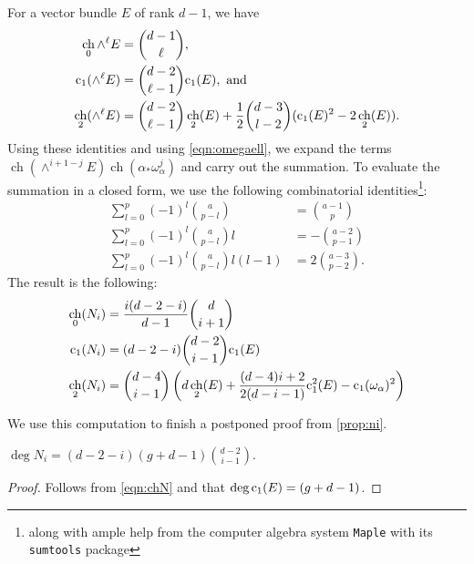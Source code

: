 \documentclass{amsart}
\DeclareMathOperator{\ch}{ch}
\renewcommand{\c}{{\rm c}}
\numberwithin{equation}{section}
\begin{document}
For a vector bundle $E$ of rank $d-1$, we have
\begin{align*}
  \ch_0 \wedge^\ell E &= {{d-1} \choose \ell}, \\
  \c_1(\wedge^\ell E) &= {{d-2} \choose {\ell - 1}} \c_1(E), \text{ and }\\
  \ch_2(\wedge^\ell E) &= {{d-2} \choose {\ell - 1}} \ch_2(E) + \frac{1}{2}{{d-3} \choose {l-2}} (\c_1(E)^2 - 2\ch_2(E)).
\end{align*}
Using these identities and using \eqref{eqn:omegaell}, we expand the terms $\ch(\wedge^{i+1-j}E)\ch(\alpha_*\omega_\alpha^j)$ and carry out the summation.
To evaluate the summation in a closed form, we use the following combinatorial identities\footnote{along with ample help from the computer algebra system \texttt{Maple} with its \texttt{sumtools} package}:
\begin{align*}
  \sum_{l=0}^p (-1)^l {a \choose {p-l}} &= {{a-1} \choose p}\\
  \sum_{l=0}^p (-1)^l {a \choose {p-l}} l &= - {{a-2} \choose {p-1}}\\
  \sum_{l=0}^p (-1)^l {a \choose {p-l}} l(l-1) &=  2 {{a-3} \choose {p-2}}.
\end{align*}
The result is the following:
\begin{equation}\label{eqn:chN}
  \begin{split}
    \ch_0 (N_i) &= \frac{i(d-2-i)}{d-1} {d \choose {i+1}} \\
    \c_1 (N_i) &= (d-2-i) {{d-2} \choose {i-1}} \c_1(E)\\
    \ch_2 (N_i) &= {{d-4} \choose {i-1}} \left(d \ch_2(E) +
      \frac{(d-4)i+2}{2(d-i-1)}\c_1^2(E) - \c_1(\omega_\alpha)^2
    \right)
  \end{split}
\end{equation}

We use this computation to finish a postponed proof from \autoref{prop:ni}.
\begin{corollary}\label{cor:degNi}
  $\deg N_i = (d-2-i) (g+d-1) {{d-2} \choose i-1}.$
\end{corollary}
\begin{proof}
  Follows from \eqref{eqn:chN} and that $\deg \c_1(E) = (g+d-1)$.
\end{proof}
\end{document}
